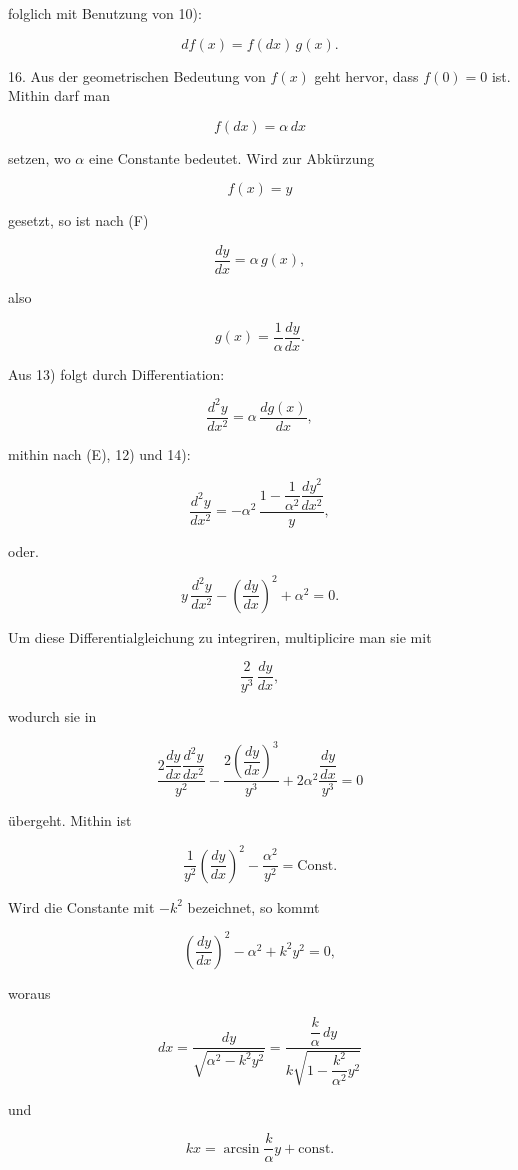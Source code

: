%
\noindent folglich mit Benutzung von 10):

\[
\tag*{(F)} df(x) = f(dx)\, g(x).
\]

16. Aus der geometrischen Bedeutung von $f(x)$ geht hervor, dass $f(0) = 0$ ist. Mithin darf man

\[
\tag*{12)} f(dx) = \alpha\, dx
\]

setzen, wo $\alpha$ eine Constante bedeutet. Wird zur Abkürzung

\[
f(x) = y
\]

\noindent gesetzt, so ist nach (F)

\[
\tag*{13)} \frac{dy}{dx} = \alpha\, g(x),
\]

also

\[
\tag*{14)} g(x) = \frac{1}{\alpha}\frac{dy}{dx}.
\]

Aus 13) folgt durch Differentiation:

\[
\frac{d^2y}{dx^2} = \alpha\, \frac{dg(x)}{dx},
\]

mithin nach (E), 12) und 14):

\[
\frac{d^2y}{dx^2} = -\alpha^2\, \frac{1 - \dfrac{1}{\alpha^2}\dfrac{dy^2}{dx^2}}{y},
\]

oder.

\[
\tag*{15)} y\, \frac{d^2y}{dx^2} - \left(\frac{dy}{dx}\right)^2 + \alpha^2 = 0.
\]

Um diese Differentialgleichung zu integriren, multiplicire man sie mit

\[
\frac{2}{y^3}\, \frac{dy}{dx},
\]

wodurch sie in

\[
\frac{2\dfrac{dy}{dx}\dfrac{d^2y}{dx^2}}{y^2} - \frac{2\left(\dfrac{dy}{dx}\right)^3}{y^3} + 2\alpha^2\frac{\dfrac{dy}{dx}}{y^3} = 0
\]

übergeht. Mithin ist

\[
\frac{1}{y^2}\left(\frac{dy}{dx}\right)^2 - \frac{\alpha^2}{y^2} = \text{Const.}
\]

Wird die Constante mit $-k^2$ bezeichnet, so kommt

\[
\left(\frac{dy}{dx}\right)^2 - \alpha^2 + k^2 y^2 = 0,
\]

\noindent woraus

\[
dx = \frac{dy}{\sqrt{\alpha^2 - k^2 y^2}} = \frac{\dfrac{k}{\alpha}\, dy}{k\sqrt{1 - \dfrac{k^2}{\alpha^2} y^2}}
\]

und

\[
kx = \arcsin \frac{k}{\alpha} y + \text{const.}
\]
